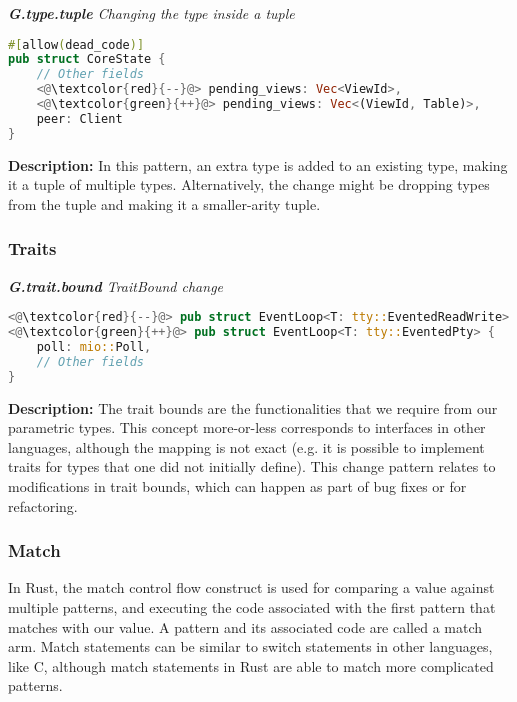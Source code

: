 \noindent\textit{\textbf{G.type.tuple} Changing the type inside a tuple}

\begin{lstlisting}[language=Rust, style=colouredRust]
#[allow(dead_code)]
pub struct CoreState {
    // Other fields
    <@\textcolor{red}{--}@> pending_views: Vec<ViewId>,
    <@\textcolor{green}{++}@> pending_views: Vec<(ViewId, Table)>,
    peer: Client
}
\end{lstlisting}



\noindent\textbf{Description:} In this pattern, an extra type is added to an existing type, making it a tuple of multiple types. Alternatively, the change might be dropping types from the tuple and making it a smaller-arity tuple.

\subsubsection{Traits}
\noindent\textit{\textbf{G.trait.bound} TraitBound change}

\begin{lstlisting}[language=Rust, style=colouredRust]
<@\textcolor{red}{--}@> pub struct EventLoop<T: tty::EventedReadWrite> {
<@\textcolor{green}{++}@> pub struct EventLoop<T: tty::EventedPty> {
    poll: mio::Poll,
    // Other fields
}

\end{lstlisting}

\noindent\textbf{Description:} The trait bounds are the functionalities that we require from our parametric types. This concept more-or-less corresponds to interfaces in other languages, although the mapping is not exact (e.g. it is possible to implement traits for types that one did not initially define). This change pattern relates to modifications in trait bounds, which can happen as part of bug fixes or for refactoring. \\

\subsubsection{Match}

In Rust, the match control flow construct is used for comparing a value against multiple patterns, and executing the code associated with the first pattern that matches with our value. A pattern and its associated code are called a match arm. Match statements can be similar to switch statements in other languages, like C, although match statements in Rust are able to match more complicated patterns.\\

